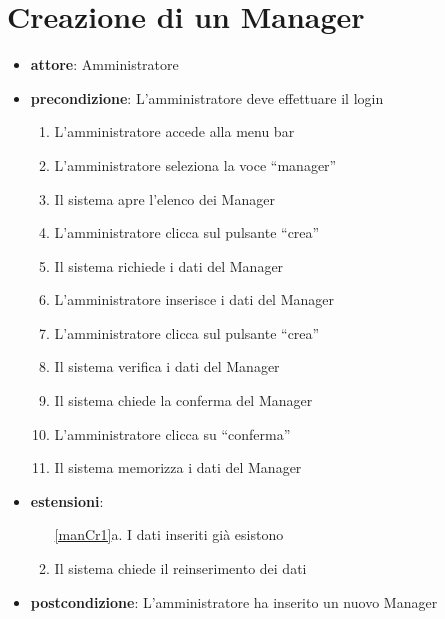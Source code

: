 \section{Creazione di un Manager}
\begin{itemize}
	\item \textbf{attore}: Amministratore
	\item \textbf{precondizione}:  L’amministratore deve effettuare il login
	
	\begin{enumerate}
		\item L’amministratore accede alla menu bar
		\item L’amministratore seleziona la voce “manager”
		\item Il sistema apre l’elenco dei Manager
		\item L’amministratore clicca sul pulsante “crea”
		\item Il sistema richiede i dati del Manager
		\item L’amministratore inserisce i dati del Manager
		\item L’amministratore clicca sul pulsante “crea”
		\label{manCr1}
		\item Il sistema verifica i dati del Manager
		\item Il sistema chiede la conferma del Manager
		\item L’amministratore clicca su “conferma”
		\item Il sistema memorizza i dati del Manager
	\end{enumerate}

	\item \textbf{estensioni}:
	\begin{enumerate}
		\item[\ref{manCr1}a.] I dati inseriti già esistono 
		\item Il sistema chiede il reinserimento dei dati
	\end{enumerate}

	\item \textbf{postcondizione}: L’amministratore ha inserito un nuovo Manager
\end{itemize}

		
